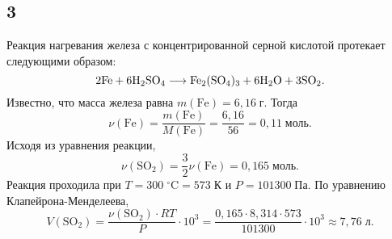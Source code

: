 \subsection{3}

Реакция нагревания железа с концентрированной серной кислотой протекает следующими образом:
\[
\rm 2Fe+6H_2SO_4\longrightarrow Fe_2(SO_4)_3+6H_2O+3SO_2.
\]
Известно, что масса железа равна $m(\mathrm{Fe})=6{,}16\;\text{г}$. Тогда
\[
\nu(\mathrm{Fe})=\frac{m(\mathrm{Fe})}{M(\mathrm{Fe})}=\frac{6{,}16}{56}=0{,}11\;\text{моль}.
\]
Исходя из уравнения реакции,
\[
\nu(\mathrm{SO_2})=\frac{3}{2}\nu(\mathrm{Fe})=0{,}165\;\text{моль}.
\]
Реакция проходила при $T=300\;^\circ\text{C}=573\;\text{К}$ и $P=101300\;\text{Па}$. По уравнению Клапейрона-Менделеева,
\[
V(\mathrm{SO_2})=\frac{\nu(\mathrm{SO_2})\cdot RT}{P}\cdot10^3=\frac{0{,}165\cdot8{,}314\cdot573}{101300}\cdot10^3\approx7{,}76\;\text{л}.
\]